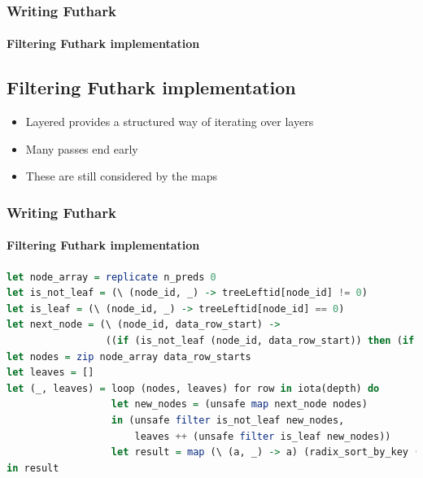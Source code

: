 \documentclass[12pt,t]{beamer}
\begin{document}
\begin{frame}
  \frametitle{Writing Futhark}
  \framesubtitle{Filtering Futhark implementation}
\subsection{Filtering Futhark implementation}

\begin{itemize}
  \item Layered provides a structured way of iterating over layers
  \item Many passes end early
  \item These are still considered by the maps
\end{itemize}

\end{frame}
\begin{frame}[fragile]
\frametitle{Writing Futhark}
\framesubtitle{Filtering Futhark implementation}
\begin{minipage}{\textwidth}
\begin{lstlisting}[basicstyle=\tiny, language=Haskell, breaklines]
let node_array = replicate n_preds 0
let is_not_leaf = (\ (node_id, _) -> treeLeftid[node_id] != 0)
let is_leaf = (\ (node_id, _) -> treeLeftid[node_id] == 0)
let next_node = (\ (node_id, data_row_start) ->
                 ((if (is_not_leaf (node_id, data_row_start)) then (if Xtest[data_row_start + treeFeature[node_id]] <= treeThres_or_leaf[node_id] then treeLeftid[node_id] else treeRightid[node_id]) else node_id), data_row_start))
let nodes = zip node_array data_row_starts
let leaves = []
let (_, leaves) = loop (nodes, leaves) for row in iota(depth) do
                  let new_nodes = (unsafe map next_node nodes)
                  in (unsafe filter is_not_leaf new_nodes,
                      leaves ++ (unsafe filter is_leaf new_nodes))
                  let result = map (\ (a, _) -> a) (radix_sort_by_key (\ (_, a) -> a) i32.num_bits i32.get_bit leaves)
in result
\end{lstlisting}
\end{minipage}




\end{frame}
\end{document}
